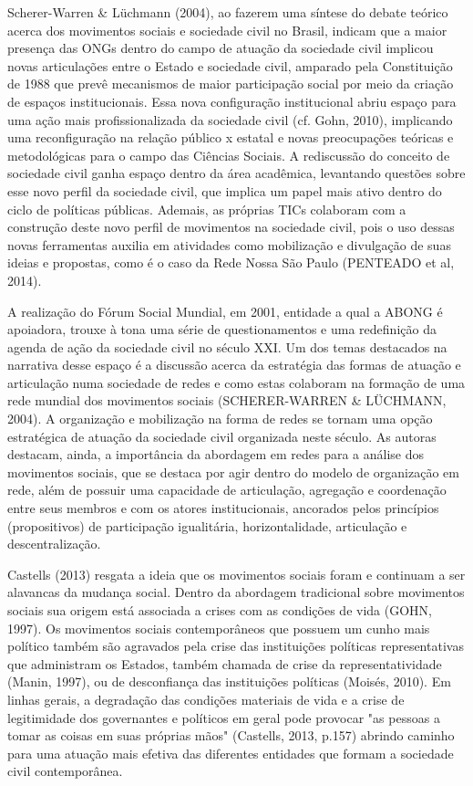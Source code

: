Scherer-Warren \& Lüchmann (2004), ao fazerem uma síntese do debate
teórico acerca dos movimentos sociais e sociedade civil no Brasil,
indicam que a maior presença das ONGs dentro do campo de atuação da
sociedade civil implicou novas articulações entre o Estado e sociedade
civil, amparado pela Constituição de 1988 que prevê mecanismos de maior
participação social por meio da criação de espaços institucionais. Essa
nova configuração institucional abriu espaço para uma ação mais
profissionalizada da sociedade civil (cf. Gohn, 2010), implicando uma
reconfiguração na relação público x estatal e novas preocupações
teóricas e metodológicas para o campo das Ciências Sociais. A
rediscussão do conceito de sociedade civil ganha espaço dentro da área
acadêmica, levantando questões sobre esse novo perfil da sociedade
civil, que implica um papel mais ativo dentro do ciclo de políticas
públicas. Ademais, as próprias TICs colaboram com a construção deste
novo perfil de movimentos na sociedade civil, pois o uso dessas novas
ferramentas auxilia em atividades como mobilização e divulgação de suas
ideias e propostas, como é o caso da Rede Nossa São Paulo (PENTEADO et
al, 2014).

A realização do Fórum Social Mundial, em 2001, entidade a qual a ABONG é
apoiadora, trouxe à tona uma série de questionamentos e uma redefinição
da agenda de ação da sociedade civil no século XXI. Um dos temas
destacados na narrativa desse espaço é a discussão acerca da estratégia
das formas de atuação e articulação numa sociedade de redes e como estas
colaboram na formação de uma rede mundial dos movimentos sociais
(SCHERER-WARREN \& LÜCHMANN, 2004). A organização e mobilização na forma
de redes se tornam uma opção estratégica de atuação da sociedade civil
organizada neste século. As autoras destacam, ainda, a importância da
abordagem em redes para a análise dos movimentos sociais, que se destaca
por agir dentro do modelo de organização em rede, além de possuir uma
capacidade de articulação, agregação e coordenação entre seus membros e
com os atores institucionais, ancorados pelos princípios (propositivos)
de participação igualitária, horizontalidade, articulação e
descentralização.

Castells (2013) resgata a ideia que os movimentos sociais foram e
continuam a ser alavancas da mudança social. Dentro da abordagem
tradicional sobre movimentos sociais sua origem está associada a crises
com as condições de vida (GOHN, 1997). Os movimentos sociais
contemporâneos que possuem um cunho mais político também são agravados
pela crise das instituições políticas representativas que administram os
Estados, também chamada de crise da representatividade (Manin, 1997), ou
de desconfiança das instituições políticas (Moisés, 2010). Em linhas
gerais, a degradação das condições materiais de vida e a crise de
legitimidade dos governantes e políticos em geral pode provocar "as
pessoas a tomar as coisas em suas próprias mãos" (Castells, 2013, p.157)
abrindo caminho para uma atuação mais efetiva das diferentes entidades
que formam a sociedade civil contemporânea.

